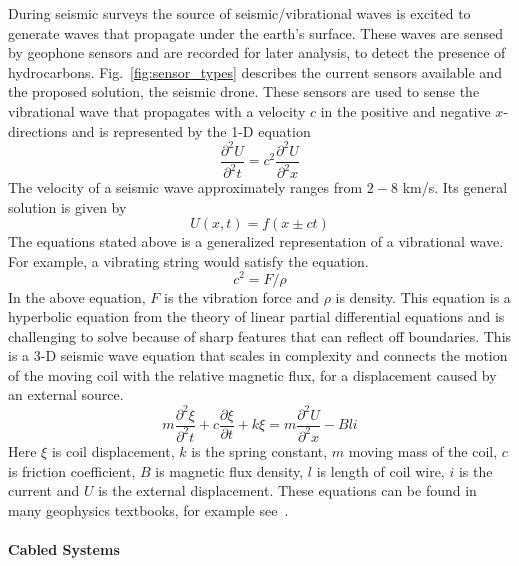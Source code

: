 During seismic surveys the source of seismic/vibrational waves is excited to generate waves that propagate under the earth's surface. These waves are sensed by geophone sensors and are recorded for later analysis, to detect the presence of hydrocarbons. Fig.~\ref{fig:sensor_types} describes the current sensors available and the proposed solution, the seismic drone. These sensors are used to sense the vibrational wave that propagates with a velocity $c$ in the positive and negative $x$-directions and is represented by the 1-D equation
\begin{equation}
\frac{\partial^{2}{U}}{\partial^{2}{t}} = {c}^{2}\frac{\partial^{2}{U}}{\partial^{2}{x}}
\end{equation}
The velocity of a seismic wave approximately ranges from $2-8$ km/s.
Its general solution is given by
\begin{equation}
U(x,t) = f(x \pm ct)
\end{equation}
The equations stated above is a generalized representation of a vibrational wave. For example, a vibrating string would satisfy the equation. 
\begin{equation}
{c}^{2} = F/\rho
\end{equation}
In the above equation, $F$ is the vibration force and $\rho$ is density.
This equation is a hyperbolic equation from the theory of linear partial differential equations and is challenging to solve because of sharp features that can reflect off boundaries. This is a $3$-D seismic wave equation that scales in complexity and connects the motion of the moving coil with the relative magnetic flux, for a displacement caused by an external source.
\begin{equation}
m\frac{\partial^{2}{\xi}}{\partial^{2}{t}}+c\frac{\partial{\xi}}{\partial{t}}+k\xi = m\frac{\partial^{2}{U}}{\partial^{2}{x}}-Bli
\end{equation} 
Here $\xi$ is coil displacement, $k$ is the spring constant, $m$ moving mass of the coil, $c$ is friction coefficient, $B$ is magnetic flux density, $l$ is length of coil wire, $i$ is the current and $U$ is the external displacement. These equations can be found in many geophysics textbooks, for example see~\cite{shearer2009introduction}.

 \paragraph{Cabled Systems}

